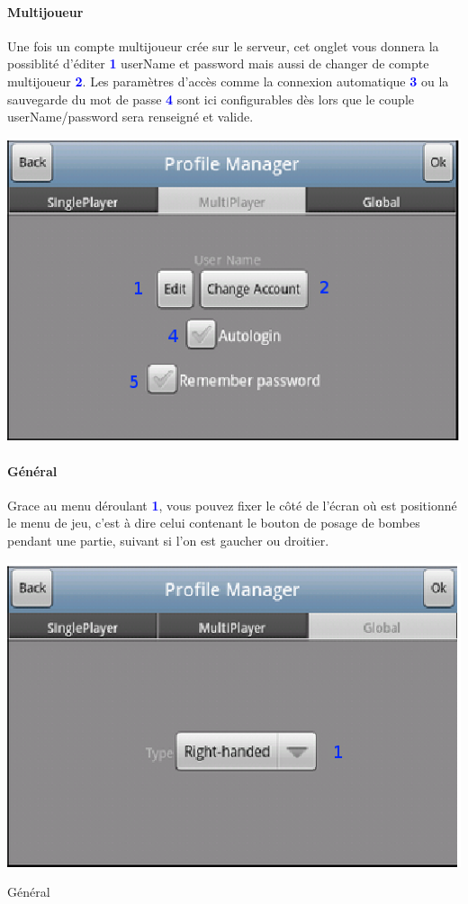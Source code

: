 		\paragraph{Multijoueur\\}
		Une fois un compte multijoueur crée sur le serveur, cet onglet vous donnera la
		possiblité d'éditer \textcolor{blue}{\textbf{1}} userName et password mais
		aussi de changer de compte multijoueur \textcolor{blue}{\textbf{2}}. Les
		paramètres d'accès comme la connexion automatique
		\textcolor{blue}{\textbf{3}} ou la sauvegarde du mot de passe
		\textcolor{blue}{\textbf{4}} sont ici configurables dès lors que le couple
		userName/password sera renseigné et valide.
		
		\begin{center}
				\includegraphics[scale=0.8]{Manuel/Img/6.eps}
		\end{center}
		
		\newpage{}	
		\paragraph{Général\\}
		Grace au menu déroulant \textcolor{blue}{\textbf{1}}, vous pouvez fixer le
		côté de l'écran où est positionné le menu de jeu, c'est à dire celui contenant
		le bouton de posage de bombes pendant une partie, suivant si l'on est gaucher ou droitier. 
		
		\begin{center}
				\includegraphics[scale=0.8]{Manuel/Img/7.eps}
				\caption{Général}
		\end{center}
			

